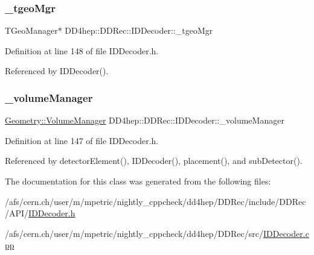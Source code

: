 \subsubsection{\texorpdfstring{\+\_\+tgeo\+Mgr}{\_tgeoMgr}}
{\footnotesize\ttfamily T\+Geo\+Manager$\ast$ D\+D4hep\+::\+D\+D\+Rec\+::\+I\+D\+Decoder\+::\+\_\+tgeo\+Mgr\hspace{0.3cm}{\ttfamily [protected]}}



Definition at line 148 of file I\+D\+Decoder.\+h.



Referenced by I\+D\+Decoder().

\hypertarget{class_d_d4hep_1_1_d_d_rec_1_1_i_d_decoder_ad5da6c6624c9c8fa3fa9c0590d9bbb70}{}\label{class_d_d4hep_1_1_d_d_rec_1_1_i_d_decoder_ad5da6c6624c9c8fa3fa9c0590d9bbb70} 
\subsubsection{\texorpdfstring{\+\_\+volume\+Manager}{\_volumeManager}}
{\footnotesize\ttfamily \hyperlink{class_d_d4hep_1_1_geometry_1_1_volume_manager}{Geometry\+::\+Volume\+Manager} D\+D4hep\+::\+D\+D\+Rec\+::\+I\+D\+Decoder\+::\+\_\+volume\+Manager\hspace{0.3cm}{\ttfamily [protected]}}



Definition at line 147 of file I\+D\+Decoder.\+h.



Referenced by detector\+Element(), I\+D\+Decoder(), placement(), and sub\+Detector().



The documentation for this class was generated from the following files\+:\begin{DoxyCompactItemize}
\item 
/afs/cern.\+ch/user/m/mpetric/nightly\+\_\+cppcheck/dd4hep/\+D\+D\+Rec/include/\+D\+D\+Rec/\+A\+P\+I/\hyperlink{_i_d_decoder_8h}{I\+D\+Decoder.\+h}\item 
/afs/cern.\+ch/user/m/mpetric/nightly\+\_\+cppcheck/dd4hep/\+D\+D\+Rec/src/\hyperlink{_i_d_decoder_8cpp}{I\+D\+Decoder.\+cpp}\end{DoxyCompactItemize}
